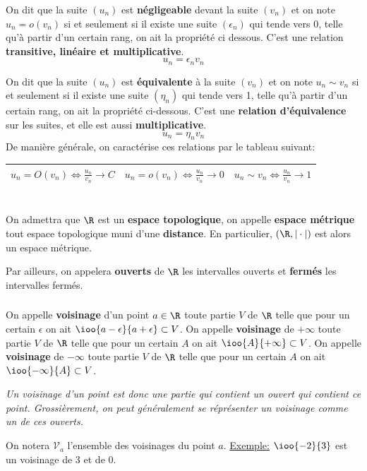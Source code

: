 On dit que la suite \((u_n)\) est \textbf{négligeable} devant la suite \((v_n)\) et on note \(u_n = o(v_n)\) si et seulement si il existe une suite \((\epsilon_n)\) qui tende vers 0, telle qu'à partir d'un certain rang, on ait la propriété ci dessous.\+
C'est une relation \textbf{transitive, linéaire et multiplicative}.
\[
    u_n = \epsilon_n v_n
\]

On dit que la suite \((u_n)\) est \textbf{équivalente} à la suite \((v_n)\) et on note \(u_n \sim v_n\) si et seulement si il existe une suite \((\eta_n)\) qui tende vers 1, telle qu'à partir d'un certain rang, on ait la propriété ci-dessous.\+ 
C'est une \textbf{relation d'équivalence} sur les suites, et elle est aussi \textbf{multiplicative}. 
\[
    u_n = \eta_n v_n
\]
De manière générale, on caractérise ces relations par le tableau suivant:
\begin{center}
    \renewcommand{\arraystretch}{1.5}%
    \begin{tabular}{| c | c | c |}
    \hline
    \(u_n = O(v_n) \Longleftrightarrow \frac{u_n}{v_n} \longrightarrow C\) &    \(u_n = o(v_n) \Longleftrightarrow \frac{u_n}{v_n} \longrightarrow 0\) &    \(u_n \sim v_n \Longleftrightarrow \frac{u_n}{v_n} \longrightarrow 1\)\\ [1.5ex]
    \hline
    \end{tabular}
 \end{center}  

\chapter*{} %

On admettra que \(\R\) est un \textbf{espace topologique}, on appelle \textbf{espace métrique} tout espace topologique muni d'une \textbf{distance}. En particulier, \((\R, |\cdot|)\) est alors un espace métrique.\<

Par ailleurs, on appelera \textbf{ouverts} de \(\R\) les intervalles ouverts et \textbf{fermés} les intervalles fermés.

\subsection*{}
On appelle \textbf{voisinage} d'un point \(a \in \R\) toute partie \(V\) de \(\R\) telle que pour un certain \(\epsilon\) on ait \(\ioo{a - \epsilon}{a + \epsilon} \subset V\).\+
On appelle \textbf{voisinage} de \(+\infty\) toute partie \(V\) de \(\R\) telle que pour un certain \(A\) on ait \(\ioo{A}{+\infty} \subset V\).\+
On appelle \textbf{voisinage} de \(-\infty\) toute partie \(V\) de \(\R\) telle que pour un certain \(A\) on ait \(\ioo{-\infty}{A} \subset V\).\+
\begin{center}
   \textit{
      Un voisinage d'un point est donc une partie qui contient un ouvert qui contient ce point. Grossièrement, on peut généralement se réprésenter un voisinage comme un de ces ouverts.
   }
\end{center}
On notera \(\mathscr{V}_a\) l'ensemble des voisinages du point \(a\).\+
\underline{Exemple:} \(\ioo{-2}{3}\) est un voisinage de \(3\) et de \(0\).

